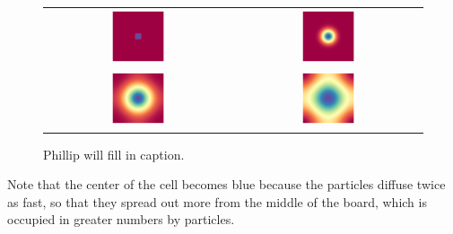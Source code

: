 \begin{figure}[h]
\centering
\mySfFamily
\begin{tabular}{c c}
\includegraphics[width = 0.3\textwidth]{../images/diffusion__Moment_1.png} & \includegraphics[width = 0.3\textwidth]{../images/diffusion__Moment_2.png} \\[2ex]
\includegraphics[width = 0.3\textwidth]{../images/diffusion__Moment_3.png} & \includegraphics[width = 0.3\textwidth]{../images/diffusion__Moment_4.png}
\end{tabular}
\caption{Phillip will fill in caption.}
\label{fig:diffusion_movie_still}
\end{figure}

Note that the center of the cell becomes blue because the  particles diffuse twice as fast, so that they spread out more from the middle of the board, which is occupied in greater numbers by  particles.

